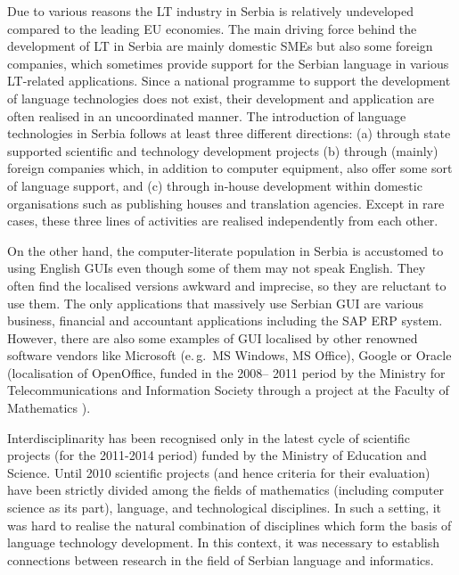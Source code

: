 \begin{multicols}{2}
Due to various reasons the LT industry in Serbia is relatively undeveloped compared to the leading EU economies. The main driving force behind the development of LT in Serbia are mainly domestic SMEs but also some foreign companies, which sometimes provide support for the Serbian language in various LT-related applications. Since a national programme to support the development of language technologies does not exist, their development and application are often realised in an uncoordinated manner. The introduction of language technologies in Serbia follows at least three different directions: (a) through state supported scientific and technology development projects (b) through (mainly) foreign companies which, in addition to computer equipment, also offer some sort of language support, and (c) through in-house development within domestic organisations such as publishing houses and translation agencies. Except in rare cases, these three lines of activities are realised independently from each other. 

On the other hand, the computer-literate population in Serbia is accustomed to using English GUIs even though some of them may not speak English. They often find the localised versions awkward and imprecise, so they are reluctant to use them. The only applications that massively use Serbian GUI are various business, financial and accountant applications including the SAP ERP system. However, there are also some examples of GUI localised by other renowned software vendors like Microsoft (e.\,g.~MS Windows, MS Office), Google or Oracle (localisation of OpenOffice, funded in the 2008-- 2011 period by the Ministry for Telecommunications and Information Society through a project at the Faculty of Mathematics \cite{OO_MATF}).

Interdisciplinarity has been recognised only in the latest cycle of scientific projects (for the 2011-2014 period) funded by the Ministry of Education and Science. Until 2010 scientific projects (and hence criteria for their evaluation) have been strictly divided among the fields of mathematics (including computer science as its part), language, and technological disciplines. In such a setting, it was hard to realise the natural combination of disciplines which form the basis of language technology development. In this context, it was necessary to establish connections between research in the field of Serbian language and informatics. 


\end{multicols}
